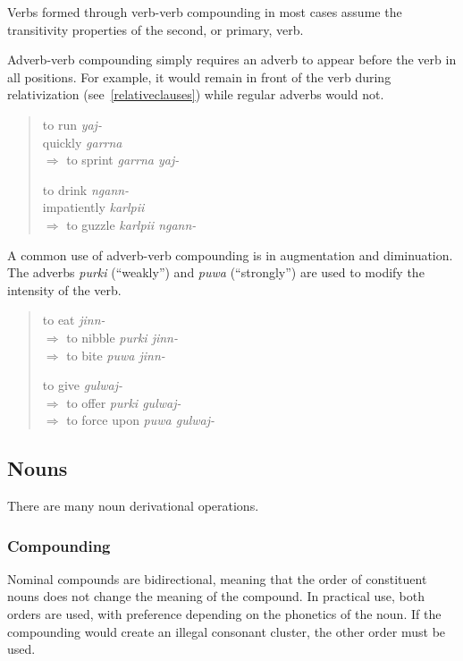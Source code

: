 Verbs formed through verb-verb compounding in most cases assume the transitivity
properties of the second, or primary, verb.

Adverb-verb compounding simply requires an adverb to appear before the verb in
all positions. For example, it would remain in front of the verb during
relativization (see~\ref{relativeclauses}) while regular adverbs would not.

\begin{quote}
\begin{multicols}{2}
to run \textit{yaj-}\\
quickly \textit{garrna}\\
$\Rightarrow$ to sprint \textit{garrna yaj-}

to drink \textit{ngann-}\\
impatiently \textit{karlpii}\\
$\Rightarrow$ to guzzle \textit{karlpii ngann-}
\end{multicols}
\end{quote}

A common use of adverb-verb compounding is in augmentation and diminuation. The
adverbs \textit{purki} (``weakly'') and \textit{puwa} (``strongly'') are used to
modify the intensity of the verb.

\begin{quote}
\begin{multicols}{2}
to eat \textit{jinn-}\\
$\Rightarrow$ to nibble \textit{purki jinn-}\\
$\Rightarrow$ to bite \textit{puwa jinn-}

to give \textit{gulwaj-}\\
$\Rightarrow$ to offer \textit{purki gulwaj-}\\
$\Rightarrow$ to force upon \textit{puwa gulwaj-}
\end{multicols}
\end{quote}

\subsection{Nouns}

There are many noun derivational operations.

\subsubsection{Compounding}

Nominal compounds are bidirectional, meaning that the order of constituent nouns
does not change the meaning of the compound. In practical use, both orders are
used, with preference depending on the phonetics of the noun. If the compounding
would create an illegal consonant cluster, the other order must be used.


